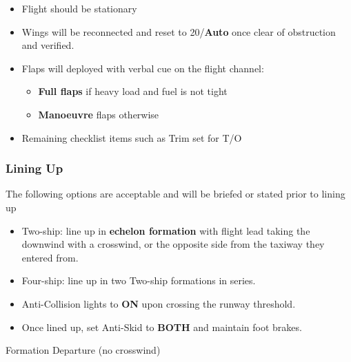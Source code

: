 \begin{itemize}

  \item Flight should be stationary

  \item Wings will be reconnected and reset to 20\textdegree/\textbf{Auto} once
    clear of obstruction and verified.

  \item Flaps will deployed with verbal cue on the flight channel:

  \begin{itemize}

    \item \textbf{Full flaps} if heavy load and fuel is not tight

    \item \textbf{Manoeuvre} flaps otherwise

  \end{itemize}

  \item Remaining checklist items such as Trim set for T/O

\end{itemize}

\subsubsection{Lining Up}

The following options are acceptable and will be briefed or stated prior to
lining up

\begin{itemize}

  \item Two-ship: line up in \textbf{echelon formation} with flight lead taking
    the downwind with a crosswind, or the opposite side from the taxiway they
    entered from.

  \item Four-ship: line up in two Two-ship formations in series.

  \item Anti-Collision lights to \textbf{ON} upon crossing the runway threshold.

  \item Once lined up, set Anti-Skid to \textbf{BOTH} and maintain foot brakes.

\end{itemize}

Formation Departure (no crosswind)

